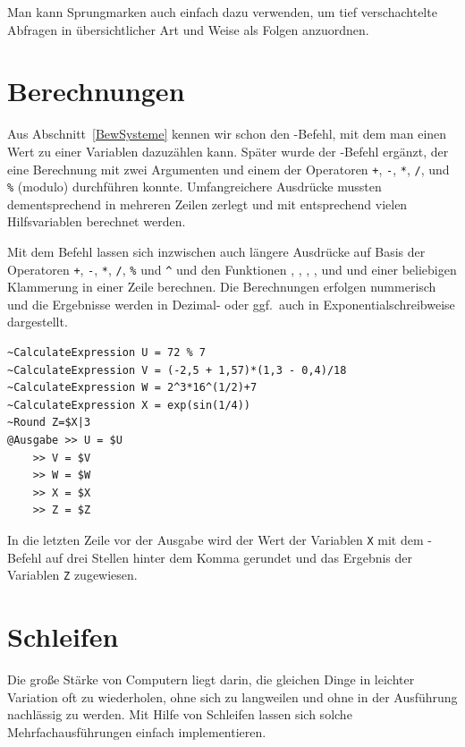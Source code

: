 Man kann Sprungmarken auch einfach dazu verwenden, um tief verschachtelte Abfragen in übersichtlicher Art und Weise als Folgen anzuordnen.

\section{Berechnungen}\label{Berechnungen}
Aus Abschnitt~\ref{BewSysteme} kennen wir schon den -Befehl, mit dem man einen Wert zu einer Variablen dazuzählen kann. Später wurde der -Befehl ergänzt, der eine Berechnung mit zwei Argumenten und einem der Operatoren \verb|+|, \verb|-|, \verb|*|, \verb|/|, und \verb|%| 
(modulo) durchführen konnte. Umfangreichere Ausdrücke mussten dementsprechend in mehreren Zeilen zerlegt und mit entsprechend vielen Hilfsvariablen berechnet werden.

Mit dem Befehl  lassen sich inzwischen auch längere Ausdrücke auf Basis der Operatoren \verb|+|, \verb|-|, \verb|*|, \verb|/|, \verb|%| 
und \verb|^| und den Funktionen , , , ,  und  und einer beliebigen Klammerung in einer Zeile berechnen. Die Berechnungen erfolgen nummerisch und die Ergebnisse werden in Dezimal- oder ggf.\ auch in Exponentialschreibweise dargestellt.

\label{BspBerechnungen}
\begin{verbatim}
~CalculateExpression U = 72 % 7
~CalculateExpression V = (-2,5 + 1,57)*(1,3 - 0,4)/18
~CalculateExpression W = 2^3*16^(1/2)+7
~CalculateExpression X = exp(sin(1/4))
~Round Z=$X|3
@Ausgabe >> U = $U
    >> V = $V
    >> W = $W
    >> X = $X
    >> Z = $Z
\end{verbatim}

In die letzten Zeile vor der Ausgabe wird der Wert der Variablen \verb|X| mit dem -Befehl auf drei Stellen hinter dem Komma gerundet und das Ergebnis der Variablen \verb|Z| zugewiesen.

\section{Schleifen}\label{Schleifen}
Die große Stärke von Computern liegt darin, die gleichen Dinge in leichter Variation oft zu wiederholen, ohne sich zu langweilen und ohne in der Ausführung nachlässig zu werden. Mit Hilfe von Schleifen lassen sich solche Mehrfachausführungen einfach implementieren.

